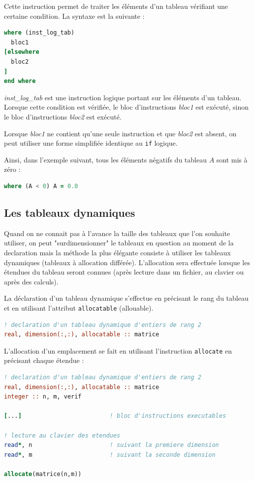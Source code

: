 \documentclass[a4paper,twoside]{article}
\begin{document}
Cette instruction permet de traiter les éléments d'un tableau vérifiant une certaine condition. La syntaxe est la suivante :

\begin{lstlisting}[language=Fortran]
where (inst_log_tab)
  bloc1 
[elsewhere 
  bloc2 
] 
end where
\end{lstlisting}
\emph{inst\_log\_tab} est une instruction logique portant sur les éléments d'un tableau. Lorsque cette condition est vérifiée, le bloc d'instructions \emph{bloc1} est exécuté, sinon le bloc d'instructions \emph{bloc2} est exécuté. 

Lorsque \emph{bloc1} ne contient qu'une seule instruction et que \emph{bloc2} est absent, on peut utiliser une forme simplifiée identique au \texttt{if} logique. 

Ainsi, dans l'exemple suivant, tous les éléments négatifs du tableau $A$ sont mis à zéro : 
\begin{lstlisting}[language=Fortran]
where (A < 0) A = 0.0
\end{lstlisting}

\subsection{Les tableaux dynamiques}

Quand on ne connait pas à l'avance la taille des tableaux que l'on souhaite utiliser, on peut "surdimensionner" le tableaux en question au moment de la declaration mais la méthode la plus élégante consiste à utiliser les tableaux dynamiques (tableaux à allocation différée). L'allocation sera effectuée lorsque les étendues du tableau seront connues (après lecture dans un fichier, au clavier ou après des calculs).

\bigskip

La déclaration d'un tableau dynamique s'effectue en précisant le 
rang du tableau et en utilisant l'attribut \texttt{allocatable} 
(allouable). 
\begin{lstlisting}[language=Fortran]
! declaration d'un tableau dynamique d'entiers de rang 2 
real, dimension(:,:), allocatable :: matrice
\end{lstlisting}

\bigskip

L'allocation d'un emplacement se fait en utilisant l'instruction \texttt{allocate} en précisant chaque étendue :
\begin{lstlisting}[language=Fortran]
! declaration d'un tableau dynamique d'entiers de rang 2 
real, dimension(:,:), allocatable :: matrice
integer :: n, m, verif

[...]                         ! bloc d'instructions executables

! lecture au clavier des etendues
read*, n                      ! suivant la premiere dimension
read*, m                      ! suivant la seconde dimension

allocate(matrice(n,m))
\end{lstlisting}
\end{document}
